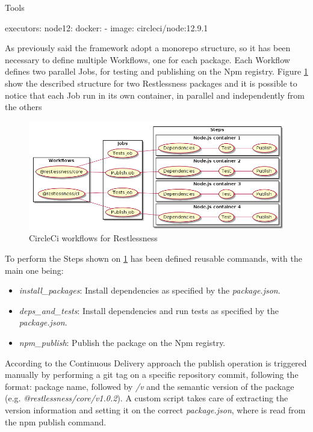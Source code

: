 \begin{chapter}{Tools}
    \bigskip
    \begin{code}[caption=Reusable executor definition, label={lst:ci_executor},
        language=yaml]
executors:
  node12:
    docker:
      - image: circleci/node:12.9.1
    \end{code}

    As previously said the framework adopt a monorepo structure, so it has been
    necessary to define multiple Workflows, one for each package. Each Workflow
    defines two parallel Jobs, for testing and publishing on the Npm registry.
    Figure \ref{fig:ci_workflow_diagram} show the described structure for two Restlessness
    packages and it is possible to notice that each Job run in its own container,
    in parallel and independently from the others

    \begin{figure}
        \centering
        \includegraphics[width=\linewidth]{source/diagrams/ci_workflow.png}
        \caption{CircleCi workflows for Restlessness}
        \label{fig:ci_workflow_diagram}
    \end{figure}

    To perform the Steps shown on \ref{fig:ci_workflow_diagram} has been defined
    reusable commands, with the main one being:
    \begin{itemize}
        \item \textit{install\_packages}: Install dependencies as specified by the
            \textit{package.json}.
        \item \textit{deps\_and\_tests}: Install dependencies and run tests as
            specified by the \mbox{\textit{package.json}}.
        \item \textit{npm\_publish}: Publish the package on the Npm registry.
    \end{itemize}

    According to the Continuous Delivery approach the publish operation is triggered
    manually by performing a git tag on a specific repository commit, following the
    format: package name, followed by \textit{/v} and the semantic version of the
    package (e.g. \textit{@restlessness/core/v1.0.2}). A custom script takes care
    of extracting the version information and setting it on the correct
    \textit{package.json}, where is read from the npm publish command.


\end{chapter}
